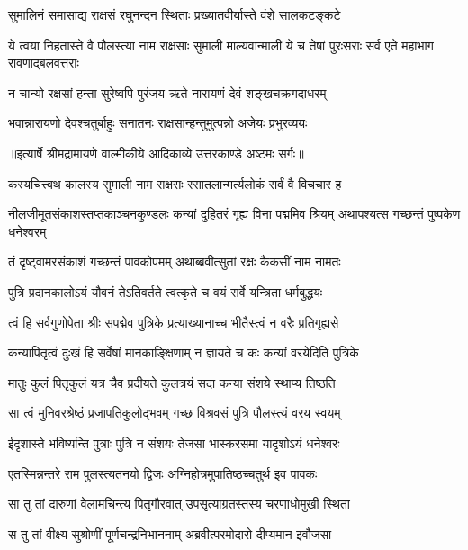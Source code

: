 \twolineshloka
{सुमालिनं समासाद्य राक्षसं रघुनन्दन}
{स्थिताः प्रख्यातवीर्यास्ते वंशे सालकटङ्कटे} %

\threelineshloka
{ये त्वया निहतास्ते वै पौलस्त्या नाम राक्षसाः}
{सुमाली माल्यवान्माली ये च तेषां पुरःसराः}
{सर्व एते महाभाग रावणाद्बलवत्तराः} %

\twolineshloka
{न चान्यो रक्षसां हन्ता सुरेष्वपि पुरंजय}
{ऋते नारायणं देवं शङ्खचक्रगदाधरम्} %

\twolineshloka
{भवान्नारायणो देवश्चतुर्बाहुः सनातनः}
{राक्षसान्हन्तुमुत्पन्नो अजेयः प्रभुरव्ययः} %


{॥इत्यार्षे श्रीमद्रामायणे वाल्मीकीये आदिकाव्ये उत्तरकाण्डे अष्टमः सर्गः॥}


\twolineshloka
{कस्यचित्त्वथ कालस्य सुमाली नाम राक्षसः}
{रसातलान्मर्त्यलोकं सर्वं वै विचचार ह} %

\threelineshloka
{नीलजीमूतसंकाशस्तप्तकाञ्चनकुण्डलः}
{कन्यां दुहितरं गृह्य विना पद्ममिव श्रियम्}
{अथापश्यत्स गच्छन्तं पुष्पकेण धनेश्वरम्} %

\twolineshloka
{तं दृष्ट्वामरसंकाशं गच्छन्तं पावकोपमम्}
{अथाब्ब्रवीत्सुतां रक्षः कैकसीं नाम नामतः} %

\twolineshloka
{पुत्रि प्रदानकालोऽयं यौवनं तेऽतिवर्तते}
{त्वत्कृते च वयं सर्वे यन्त्रिता धर्मबुद्धयः} %

\twolineshloka
{त्वं हि सर्वगुणोपेता श्रीः सपद्मेव पुत्रिके}
{प्रत्याख्यानाच्च भीतैस्त्वं न वरैः प्रतिगृह्यसे} %

\twolineshloka
{कन्यापितृत्वं दुःखं हि सर्वेषां मानकाङ्क्षिणाम्}
{न ज्ञायते च कः कन्यां वरयेदिति पुत्रिके} %

\twolineshloka
{मातुः कुलं पितृकुलं यत्र चैव प्रदीयते}
{कुलत्रयं सदा कन्या संशये स्थाप्य तिष्ठति} %

\twolineshloka
{सा त्वं मुनिवरश्रेष्ठं प्रजापतिकुलोद्भवम्}
{गच्छ विश्रवसं पुत्रि पौलस्त्यं वरय स्वयम्} %

\twolineshloka
{ईदृशास्ते भविष्यन्ति पुत्राः पुत्रि न संशयः}
{तेजसा भास्करसमा यादृशोऽयं धनेश्वरः} %

\twolineshloka
{एतस्मिन्नन्तरे राम पुलस्त्यतनयो द्विजः}
{अग्निहोत्रमुपातिष्ठच्चतुर्थ इव पावकः} %

\twolineshloka
{सा तु तां दारुणां वेलामचिन्त्य पितृगौरवात्}
{उपसृत्याग्रतस्तस्य चरणाधोमुखी स्थिता} %

\twolineshloka
{स तु तां वीक्ष्य सुश्रोणीं पूर्णचन्द्रनिभाननाम्}
{अब्रवीत्परमोदारो दीप्यमान इवौजसा} %

